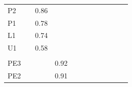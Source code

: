 \documentclass{sig-alternate-05-2015}
\begin{document}
\begin{table}[]
{\begin{tabular}{l|lllllllllll}
\multicolumn{1}{|l|}{P2}                          &                        & 0.86                   &                        &                        &                        &                        &                        &                        &                        &                         &                         \\ \cline{1-1}
\multicolumn{1}{|l|}{P1}                          &                        & 0.78                   &                        &                        &                        &                        &                        &                        &                        &                         &                         \\ \cline{1-1}
\multicolumn{1}{|l|}{L1}                          &                        & 0.74                   &                        &                        &                        &                        &                        &                        &                        &                         &                         \\ \cline{1-1}
\multicolumn{1}{|l|}{U1}                          &                        & 0.58                   &                        &                        &                        &                        &                        &                        &                        &                         &                         \\ \cline{1-1}
\rowcolor[HTML]{FE996B} 
\multicolumn{1}{|l|}{\cellcolor[HTML]{FE996B}I1}  &                        &                        &                        &                        &                        &                        &                        &                        &                        &                         &                         \\ \cline{1-1}
\multicolumn{1}{|l|}{PE3}                         &                        &                        & 0.92                   &                        &                        &                        &                        &                        &                        &                         &                         \\ \cline{1-1}
\multicolumn{1}{|l|}{PE2}                         &                        &                        & 0.91                   &                        &                        &                        &                        &                        &                        &                         &                         \\ \cline{1-1}

\end{tabular}}
\end{table}
\end{document}
